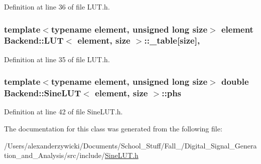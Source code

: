 Definition at line 36 of file L\+U\+T.\+h.

\hypertarget{classBackend_1_1LUT_ae70f3f0c9aaa9e0b85517d8e2c61d9a5}{
\subsubsection[{\+\_\+table}]{\setlength{\rightskip}{0pt plus 5cm}template$<$typename element, unsigned long size$>$ element {\bf Backend\+::\+L\+U\+T}$<$ element, size $>$\+::\+\_\+table\mbox{[}size\mbox{]}\hspace{0.3cm}{\ttfamily [protected]}, {\ttfamily [inherited]}}}\label{classBackend_1_1LUT_ae70f3f0c9aaa9e0b85517d8e2c61d9a5}


Definition at line 35 of file L\+U\+T.\+h.

\hypertarget{classBackend_1_1SineLUT_af5d1e8bc8bda7d41272c17e0f2e9aad8}{
\subsubsection[{phs}]{\setlength{\rightskip}{0pt plus 5cm}template$<$typename element, unsigned long size$>$ double {\bf Backend\+::\+Sine\+L\+U\+T}$<$ element, size $>$\+::phs\hspace{0.3cm}{\ttfamily [protected]}}}\label{classBackend_1_1SineLUT_af5d1e8bc8bda7d41272c17e0f2e9aad8}


Definition at line 42 of file Sine\+L\+U\+T.\+h.



The documentation for this class was generated from the following file\+:\begin{DoxyCompactItemize}
\item 
/\+Users/alexanderzywicki/\+Documents/\+School\+\_\+\+Stuff/\+Fall\+\_/\+Digital\+\_\+\+Signal\+\_\+\+Generation\+\_\+and\+\_\+\+Analysis/src/include/\hyperlink{SineLUT_8h}{Sine\+L\+U\+T.\+h}\end{DoxyCompactItemize}
